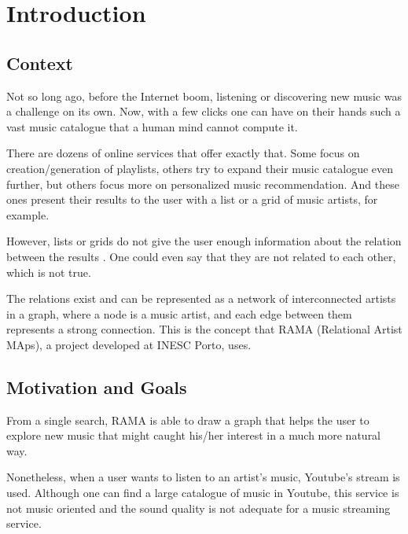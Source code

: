 
\chapter{Introduction} \label{chap:intro}


\section*{}

\section{Context} \label{sec:context}


Not so long ago, before the Internet boom, listening or discovering new music was a challenge on its own.
Now, with a few clicks one can have on their hands such a vast music catalogue that a human mind cannot compute it.

There are dozens of online services that offer  exactly that.
Some focus on creation/generation of playlists, others try to expand their music catalogue even further, but others focus more on personalized music recommendation.
And these ones present their results to the user with a list or a grid of music artists, for example.

However, lists or grids do not give the user enough information about the relation between the results \cite{Lamere2008}.
One could even say that they are not related to each other, which is not true.

The relations exist and can be represented as a network of interconnected artists in a graph, where a node is a music artist, and each edge between them represents a strong connection.
This is the concept that RAMA (Relational Artist MAps), a project developed at INESC Porto, uses. \cite{Costa2008} \cite{Sarmento2009} \cite{Costa2009} \cite{Gouyon2011}

\section{Motivation and Goals} \label{sec:goals}


From a single search, RAMA is able to draw a graph that helps the user to explore new music that might caught his/her interest in a much more natural way.

Nonetheless, when a user wants to listen to an artist's music, Youtube's stream is used.
Although one can find a large catalogue of music in Youtube, this service is not music oriented and the sound quality is not adequate for a music streaming service.

